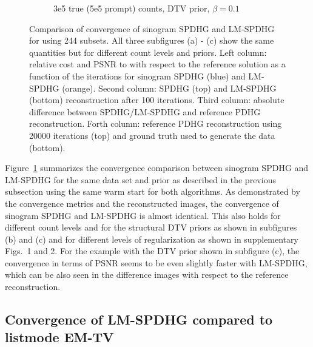 \begin{figure}
\begin{subfigure}[]{1.0\textwidth}
    \caption{3e5 true (5e5 prompt) counts, DTV prior, $\beta = 0.1$}
  \end{subfigure}
  \caption{Comparison of convergence of sinogram SPDHG and LM-SPDHG
           for using 244 subsets.
           All three subfigures (a) - (c) show the same quantities but for
           different count levels and priors.
           Left column: relative cost and PSNR to with respect to the reference solution as
           a function of the iterations for sinogram SPDHG (blue) and LM-SPDHG (orange).
           Second column: SPDHG (top) and LM-SPDHG (bottom) reconstruction after 100 iterations.
           Third column: absolute difference between SPDHG/LM-SPDHG and reference PDHG reconstruction.
           Forth column: reference PDHG reconstruction using 20000 iterations (top) and ground truth
           used to generate the data (bottom).}
  \label{fig:lm-spdhg-var}
\end{figure}

Figure~\ref{fig:lm-spdhg-var} summarizes the convergence comparison between sinogram SPDHG and 
LM-SPDHG for the same data set and prior as described in the previous subsection using the 
same warm start for both algorithms.
As demonstrated by the convergence metrics and the reconstructed images, the convergence of
sinogram SPDHG and LM-SPDHG is almost identical.
This also holds for different count levels and for the structural DTV priors 
as shown in subfigures (b) and (c) and for different levels of regularization as shown
in supplementary Figs.~1 and 2.
For the example with the DTV prior shown in subfigure (c), the convergence in terms of
PSNR seems to be even slightly faster with LM-SPDHG, which can be also
seen in the difference images with respect to the reference reconstruction.

\subsection*{Convergence of LM-SPDHG compared to listmode EM-TV}

